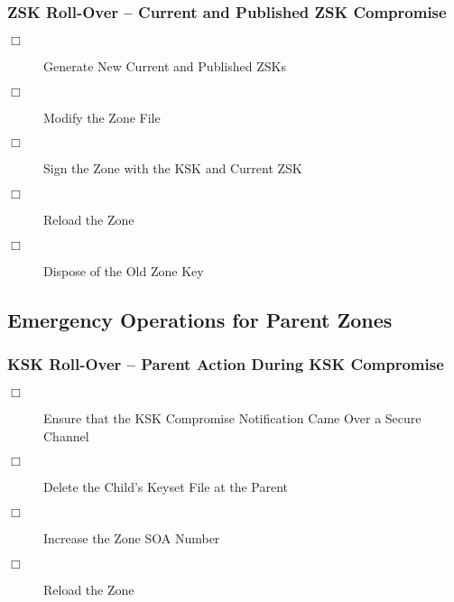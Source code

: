 
\subsubsection{ZSK Roll-Over -- Current and Published ZSK Compromise}

\begin{description}
\item [$\Box$] Generate New Current and Published ZSKs
\item [$\Box$] Modify the Zone File
\item [$\Box$] Sign the Zone with the KSK and Current ZSK
\item [$\Box$] Reload the Zone
\item [$\Box$] Dispose of the Old Zone Key
\end{description}


\clearpage
\subsection{Emergency Operations for Parent Zones}



\subsubsection{KSK Roll-Over -- Parent Action During KSK Compromise}

\begin{description}
\item [$\Box$] Ensure that the KSK Compromise Notification Came Over a Secure Channel
\item [$\Box$] Delete the Child's Keyset File at the Parent
\item [$\Box$] Increase the Zone SOA Number
\item [$\Box$] Reload the Zone
\end{description}


